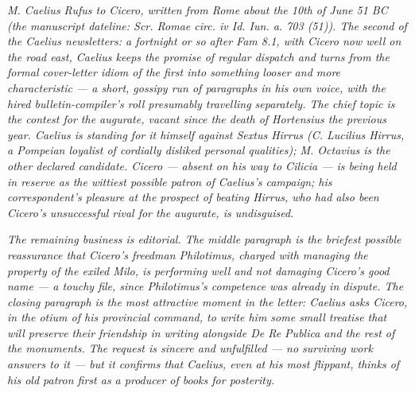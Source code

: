
\textit{M. Caelius Rufus to Cicero, written from Rome
about the 10th of June 51 BC (the manuscript dateline:
\textit{Scr. Romae circ. iv Id. Iun. a. 703 (51)}). The
second of the Caelius newsletters: a fortnight or so
after \textit{Fam} 8.1, with Cicero now well on the road
east, Caelius keeps the promise of regular dispatch and
turns from the formal cover-letter idiom of the first
into something looser and more characteristic --- a
short, gossipy run of paragraphs in his own voice, with
the hired bulletin-compiler's roll presumably travelling
separately. The chief topic is the contest for the
augurate, vacant since the death of Hortensius the
previous year. Caelius is standing for it himself
against Sextus Hirrus (C. Lucilius Hirrus, a Pompeian
loyalist of cordially disliked personal qualities);
M. Octavius is the other declared candidate. Cicero ---
absent on his way to Cilicia --- is being held in
reserve as the wittiest possible patron of Caelius's
campaign; his correspondent's pleasure at the prospect
of beating Hirrus, who had also been Cicero's
unsuccessful rival for the augurate, is undisguised.}

\textit{The remaining business is editorial. The middle
paragraph is the briefest possible reassurance that
Cicero's freedman Philotimus, charged with managing the
property of the exiled Milo, is performing well and
not damaging Cicero's good name --- a touchy file, since
Philotimus's competence was already in dispute. The
closing paragraph is the most attractive moment in the
letter: Caelius asks Cicero, in the otium of his
provincial command, to write him some small treatise
that will preserve their friendship in writing alongside
\textit{De Re Publica} and the rest of the monuments.
The request is sincere and unfulfilled --- no surviving
work answers to it --- but it confirms that Caelius,
even at his most flippant, thinks of his old patron
first as a producer of books for posterity.}
